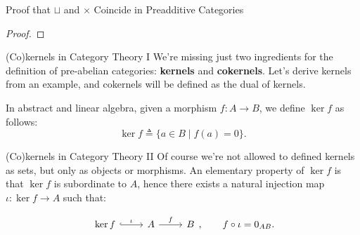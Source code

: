 \documentclass{beamer}
\begin{document}
\begin{frame}[fragile]{Proof that \texorpdfstring{$\sqcup$}{⊔} and \texorpdfstring{$\times$}{×} Coincide in Preadditive Categories}
\begin{proof}

    \end{proof}
\end{frame}

\begin{frame}{(Co)kernels in Category Theory I}
    We're missing just two ingredients for the definition of pre-abelian categories:
    \textbf{kernels} and \textbf{cokernels}. Let's derive kernels from an example,
    and cokernels will be defined as the dual of kernels. \medskip
    
    
    In abstract and linear algebra, given a morphism $f : A \to B$, we define $\ker f$ as follows:
    \[
        \ker f \triangleq \{ a \in B \mid f(a) = 0 \}.
    \]
\end{frame}

\begin{frame}{(Co)kernels in Category Theory II}
    Of course we're not allowed to defined kernels as sets, but only as objects or morphisms.
    An elementary property of $\ker f$ is that $\ker f$ is subordinate to $A$, hence
    there exists a natural injection map $\iota : \ker f \to A$ such that:

    \[\begin{tikzcd}[ampersand replacement=\&]
        {\ker f} \& A \& B
        \arrow["\iota", hook, from=1-1, to=1-2]
        \arrow["f", from=1-2, to=1-3]
    \end{tikzcd}, \qquad f \circ \iota = 0_{AB}. \]
\end{frame}
\end{document}
